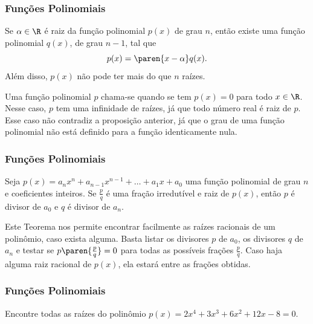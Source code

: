 \documentclass[10pt]{beamer}
\begin{document}

\begin{frame}
\frametitle{Funções Polinomiais} 
\begin{proposicao}
Se $\alpha \in \R$ é raiz da função polinomial $p(x)$ de grau $n$,
então existe uma função polinomial $q(x)$, de grau $n-1$, tal que
$$p(x) = \paren{x- \alpha}q(x).$$
Além disso, $p(x)$ não pode ter mais do que $n$ raízes.
\end{proposicao}\pause

Uma função polinomial $p$ chama-se  quando
se tem $p(x) = 0$ para todo $x \in \R$. Nesse caso, $p$ tem uma
infinidade de raízes, já que todo número real é raiz de $p$. Esse
caso não contradiz a proposição anterior, já que o grau de uma
função polinomial não está definido para a função identicamente
nula.

\end{frame}



\begin{frame}
\frametitle{Funções Polinomiais} 
\begin{teorema}
Seja $p(x) = a_n x^n + a_{n-1} x^{n-1} + \dots + a_1 x + a_0$ uma função polinomial de grau $n$ e coeficientes inteiros. Se $\frac p q$ é uma fração irredutível e raiz de $p(x)$, então $p$ é divisor de $a_0$ e $q$ é divisor de $a_n$.
\end{teorema}\pause

Este Teorema nos permite encontrar facilmente as raízes racionais de um polinômio, caso exista alguma. Basta listar os divisores $p$ de $a_0$, os divisores $q$ de $a_n$ e testar se $p\paren {\frac p q }=0$ para todas as possíveis frações $\frac p q$. Caso haja alguma raiz racional de $p(x)$, ela estará entre as frações obtidas.

\end{frame}


\begin{frame}
\frametitle{Funções Polinomiais} 

\begin{exemplo}
Encontre todas as raízes do polinômio $p(x)=2x^4 +3x^3 +6x^2 +12x -8 = 0$.
\end{exemplo}

\end{frame}
\end{document}
